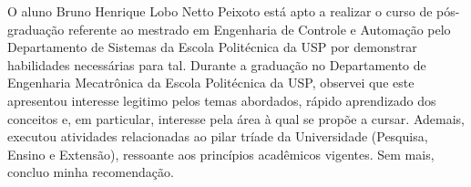 \documentclass[12pt,stdletter,orderfromtodate,sigleft]{newlfm}
\begin{document}
\begin{newlfm}
O aluno Bruno Henrique Lobo Netto Peixoto está apto a realizar o curso de pós-graduação referente ao mestrado em Engenharia de Controle e Automação pelo Departamento de Sistemas da Escola Politécnica da USP por demonstrar habilidades necessárias para tal. Durante a graduação no Departamento de Engenharia Mecatrônica da Escola Politécnica da USP, observei que este apresentou interesse legitimo pelos temas abordados, rápido aprendizado dos conceitos e, em particular, interesse pela área à qual se propõe a cursar. Ademais, executou atividades relacionadas ao pilar tríade da Universidade (Pesquisa, Ensino e Extensão), ressoante aos princípios acadêmicos vigentes. Sem mais, concluo minha recomendação.
\end{newlfm}
\end{document}
